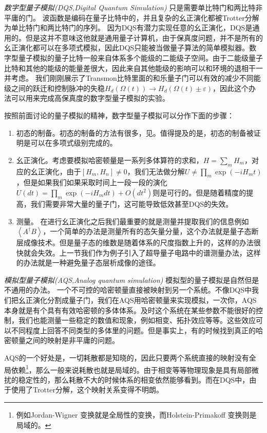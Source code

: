 \documentclass[supercite]{HustGraduPaper}
\newcommand{\avg}[1]{\left\langle #1 \right\rangle}
\begin{document}
   \emph{数字型量子模拟(DQS,Digital Quantum Simulation) }只是需要单比特门和两比特非平庸的门。 
   波函数是编码在量子比特中的，并且复杂的幺正演化都被Trotter分解为单比特门和两比特门的序列。 因为DQS有潜力实现任意的幺正演化，DQS是通用的。但是这并不意味这他就是通用量子计算机，由于保真度问题，并不是所有的幺正演化都可以在多项式模拟，因此DQS只能被当做量子算法的简单模拟器。数字型量子模拟的量子比特一般来自体系多个能级的二能级子空间。由于二能级量子比特和其他的能级的能量差很大，因此来自其他能级的影响可以和环境的退相干一并考虑。 我们刚刚展示了Transmon比特里面的和乐量子门可以有效的减少不同能级之间的跃迁和控制脉冲的失稳${H_d}\left( {\Omega \left( t \right)} \right) \to {H_d}\left( {\Omega \left( t \right) \pm \varepsilon } \right)$，因此这个办法可以用来完成高保真度的数字型量子模拟的实验。
   
   按照前面讨论的量子模拟的精神，数字型量子模拟可以分作下面的步骤\cite{Georgescu2014}：
   \begin{enumerate}
   	\item 初态的制备。初态的制备的方法有很多，见。值得提及的是，初态的制备被证明是可以在多项式级别完成的。
   	\item 幺正演化。考虑要模拟哈密顿量是一系列多体算符的求和，$H = \sum_m H_m$，对应的幺正演化，由于$[H_m,H_n] \ne 0$，我们无法做分解$U \ne \prod_m \exp(-i H_m t)$，但是如果我们如果采取时间上一段一段的演化$U(dt) = \prod_m \exp(-i H_m dt) + O(dt^2)$则是可行的。但是随着精度的提高，我们需要非常大量的量子门，这可能导致低效甚至DQS的失效。
   	\item 测量。 在进行幺正演化之后我们最重要的就是测量并提取我们的信息例如$\avg{A^\dagger B}$，一个简单的办法是测量所有的态矢量分量，这个办法就是量子态断层成像技术。但是量子态的维数是随着体系的尺度指数上升的，这样的办法很快就会失效。上一节我们作为例子引入了超导量子电路中的谱测量办法，这样的办法就是一种避免量子态层析成像的途径。
   \end{enumerate}

   
   \emph{模拟型量子模拟(AQS,Analog quantum simulation)} 模拟型的量子模拟是自然但是不通用的办法。 一个不可控的哈密顿量直接被映射到另一个系统。不像DQS中我们把幺正演化分割成量子门，我们在AQS用哈密顿量来实现模拟，一次你，AQS本身就是有个具有有效哈密顿的多体体系。及时这个系统在某些参数不能很好的控制，我们也能测量一些稳定的数值和现象，例如相变、拓扑效应等等。这些效应可以不同程度上回答不同类型的多体里的问题。但是事实上，有的时候找到真正的哈密顿量之间的映射是非平庸的问题\cite{Georgescu2014}。
   
   AQS的一个好处是，一切耗散都是知晓的，因此只要两个系统直接的映射没有全局依赖\footnote{例如Jordan-Wigner 变换就是全局性的变换，而Holstein-Primakoff 变换则是局域的。}，那么一般来说耗散也就是局域的。由于相变等等物理现象是具有局部微扰的稳定性的，那么耗散不大的时候体系的相变依然能够看到。而在DQS中，由于使用了Trotter分解，这个映射关系变得不明朗\cite{Georgescu2014}。
   
\end{document}
